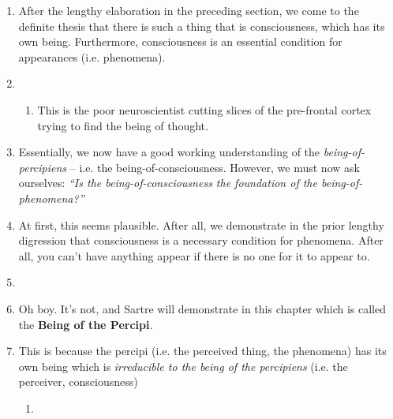 \begin{enumerate}
  \item After the lengthy elaboration in the preceding section, we come to the definite thesis that there is such a thing that is consciousness, which has its own being. Furthermore, consciousness is an essential condition for appearances (i.e. phenomena).
  \item {}
  \begin{enumerate}
    \item This is the poor neuroscientist cutting slices of the pre-frontal cortex trying to find the being of thought.
  \end{enumerate}
  \item Essentially, we now have a good working understanding of the \emph{being-of-percipiens} -- i.e. the being-of-consciousness. However, we must now ask ourselves: \emph{\enquote{Is the being-of-consciousness the foundation of the being-of-phenomena?}}
  \item At first, this seems plausible. After all, we demonstrate in the prior lengthy digression that consciousness is a necessary condition for phenomena. After all, you can't have anything appear if there is no one for it to appear to.
  \item {}
  \item Oh boy. It's not, and Sartre will demonstrate in this chapter which is called the \textbf{Being of the Percipi}.
  \item This is because the percipi (i.e. the perceived thing, the phenomena) has its own being which is \emph{irreducible to the being of the percipiens} (i.e. the perceiver, consciousness) 
  \begin{enumerate}
    \item {}
  \end{enumerate}
\end{enumerate}

